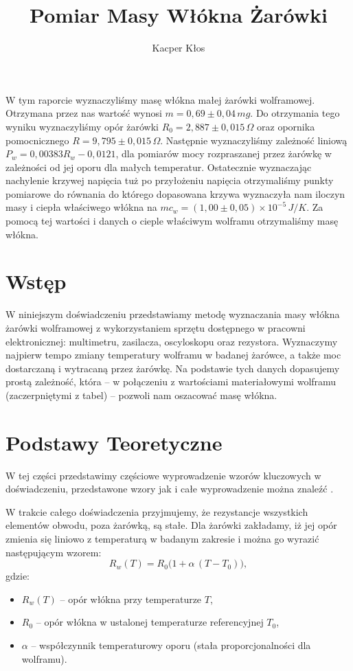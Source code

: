 \documentclass[12pt]{article}
\title{Pomiar Masy Włókna Żarówki}
\author{Kacper Kłos}
\begin{document}
\maketitle
W tym raporcie wyznaczyliśmy masę włókna małej żarówki wolframowej. Otrzymana przez nas wartość wynosi $m = 0{,}69 \pm 0{,}04 \, mg$. Do otrzymania tego wyniku wyznaczyliśmy opór żarówki $R_0 = 2{,}887 \pm 0{,}015 \, \Omega$ oraz opornika pomocnicznego $R = 9{,}795 \pm 0{,}015 \, \Omega$. Następnie wyznaczyliśmy zależność liniową $P_w = 0{,}00383 R_w - 0{,}0121$, dla pomiarów mocy rozpraszanej przez żarówkę w zależności od jej oporu dla małych temperatur. Ostatecznie wyznaczając nachylenie krzywej napięcia tuż po przyłożeniu napięcia otrzymaliśmy punkty pomiarowe do równania do którego dopasowana krzywa wyznaczyła nam iloczyn masy i ciepła właściwego włókna na $mc_w=(1{,}00 \pm 0{,}05) \times 10^{-5}\, J/K$. Za pomocą tej wartości i danych o cieple właściwym wolframu otrzymaliśmy masę włókna.
\newpage

\section{Wstęp}
W niniejszym doświadczeniu przedstawiamy metodę wyznaczania masy włókna żarówki wolframowej z wykorzystaniem sprzętu dostępnego w pracowni elektronicznej: multimetru, zasilacza, oscyloskopu oraz rezystora.  
Wyznaczymy najpierw tempo zmiany temperatury wolframu w badanej żarówce, a także moc dostarczaną i wytracaną przez żarówkę.  
Na podstawie tych danych dopasujemy prostą zależność, która – w połączeniu z wartościami materiałowymi wolframu (zaczerpniętymi z tabel) – pozwoli nam oszacować masę włókna.

\section{Podstawy Teoretyczne}
W tej części przedstawimy częściowe wyprowadzenie wzorów kluczowych w doświadczeniu, przedstawone wzory jak i całe wyprowadzenie można znaleźć \cite{skrypt}.

W trakcie całego doświadczenia przyjmujemy, że rezystancje wszystkich elementów obwodu, poza żarówką, są stałe.  
Dla żarówki zakładamy, iż jej opór zmienia się liniowo z temperaturą w badanym zakresie i można go wyrazić następującym wzorem:
\begin{equation}
    R_w(T) = R_0 \bigl(1+\alpha\,(T - T_0)\bigr),
    \label{eq:resistance}
\end{equation}
gdzie:
\begin{itemize}
\item $R_w(T)$ – opór włókna przy temperaturze $T$,  
\item $R_0$ – opór włókna w ustalonej temperaturze referencyjnej $T_0$,  
\item $\alpha$ – współczynnik temperaturowy oporu (stała proporcjonalności dla wolframu).
\end{itemize}
\end{document}
